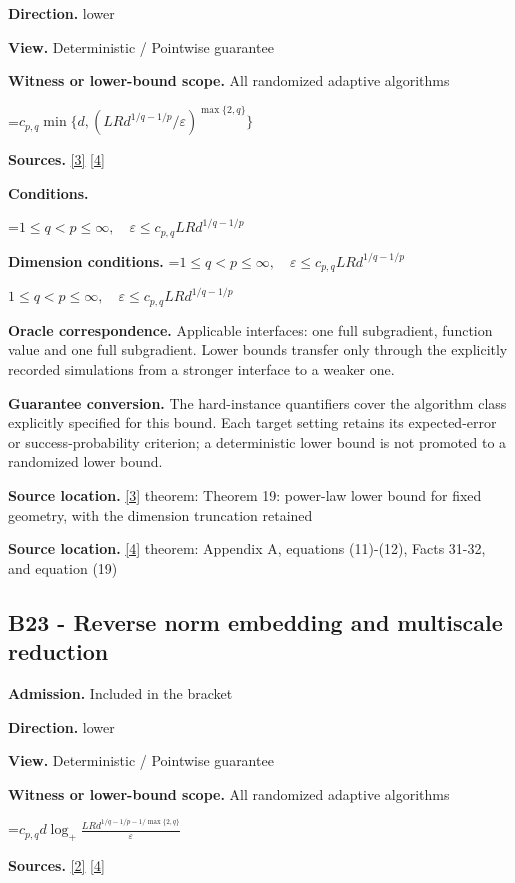 \documentclass[10pt,a4paper]{article}
\newcommand{\AtlasMath}[1]{\par\begingroup\centering\setbox0=\hbox{$\displaystyle #1$}\ifdim\wd0>1.4\linewidth\typeout{ATLAS WIDE FORMULA: \the\wd0}\fi\ifdim\wd0>\linewidth\resizebox{\linewidth}{!}{\box0}\else\box0\fi\par\endgroup}
\newcommand{\AtlasInlineMath}[1]{\begingroup\setbox0=\hbox{$#1$}\ifdim\wd0>.4\linewidth\endgroup\AtlasMath{#1}\else\endgroup$#1$\fi}
\begin{document}
\textbf{Direction.} lower

\textbf{View.} Deterministic / Pointwise guarantee

\textbf{Witness or lower-bound scope.} All randomized adaptive algorithms

\AtlasMath{c_{p,q}\min\{d,(LRd^{1/q-1/p}/\varepsilon)^{\max\{2,q\}}\}}
\textbf{Sources.} \href{https://arxiv.org/pdf/2609.20701}{[3]} \href{https://arxiv.org/pdf/2609.20687}{[4]}

\textbf{Conditions.} 
\AtlasMath{1\le q<p\le\infty,\quad\varepsilon\le c_{p,q}LRd^{1/q-1/p}}


\textbf{Dimension conditions.} \AtlasInlineMath{1\le q<p\le\infty,\quad\varepsilon\le c_{p,q}LRd^{1/q-1/p}}

\textbf{Oracle correspondence.} Applicable interfaces: one full subgradient, function value and one full subgradient. Lower bounds transfer only through the explicitly recorded simulations from a stronger interface to a weaker one.

\textbf{Guarantee conversion.} The hard-instance quantifiers cover the algorithm class explicitly specified for this bound. Each target setting retains its expected-error or success-probability criterion; a deterministic lower bound is not promoted to a randomized lower bound.

\textbf{Source location.} \href{https://arxiv.org/pdf/2609.20701}{[3]} theorem: Theorem 19: power-law lower bound for fixed geometry, with the dimension truncation retained

\textbf{Source location.} \href{https://arxiv.org/pdf/2609.20687}{[4]} theorem: Appendix A, equations (11)-(12), Facts 31-32, and equation (19)

\subsection{B23 - Reverse norm embedding and multiscale reduction}
\textbf{Admission.} Included in the bracket

\textbf{Direction.} lower

\textbf{View.} Deterministic / Pointwise guarantee

\textbf{Witness or lower-bound scope.} All randomized adaptive algorithms

\AtlasMath{c_{p,q}d\log_+\frac{LRd^{1/q-1/p-1/\max\{2,q\}}}{\varepsilon}}
\textbf{Sources.} \href{https://arxiv.org/pdf/1407.5144}{[2]} \href{https://arxiv.org/pdf/2609.20687}{[4]}
\end{document}
